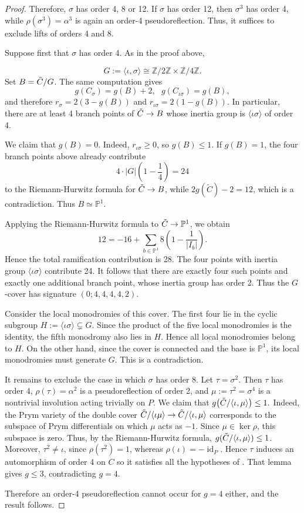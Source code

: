 \documentclass[10pt,a4paper]{amsart}
\numberwithin{equation}{section}
\newcommand{\tC}{\Tilde{C}}
\DeclareMathOperator{\id}{id}
\begin{document}
\begin{proof}
Therefore, $\sigma$ has order 4, 8 or 12. If $\sigma$ has order 12, then $\sigma^3$ has order 4, while
$\rho(\sigma^3)=\alpha^3$ is again an order-4 pseudoreflection. Thus, it suffices to exclude lifts of orders 4 and 8.

Suppose first that $\sigma$ has order 4. As in the proof above,

$$G:=\langle\iota,\sigma\rangle
\cong\mathbb{Z}/2\mathbb{Z}\times\mathbb {Z}/4\mathbb{Z}.$$
Set $B=\tC/G$. The same computation gives
$$g(C_\sigma)=g(B)+2,\ \ \ g(C_{\iota\sigma})=g(B),$$
and therefore
$r_\sigma=2(3-g(B))$ and $ r_{\iota\sigma}=2(1-g(B)).$
In particular, there are at least 4
branch points of $\tC\to B$ whose inertia group is $\langle\iota\sigma\rangle$ of order 4.

We claim that $g(B)=0$. Indeed, $r_{\iota\sigma}\geq0$, so
$g(B)\leq 1$. If $g(B)=1$, the four branch points above already
contribute $$4\cdot |G|\left(1-\frac14\right)=24$$
to the Riemann-Hurwitz formula for $\tC\to B$, while $2g(\widetilde C)-2=12$, which is a contradiction. Thus $B\simeq\mathbb{P}^1$.

Applying the Riemann-Hurwitz formula to 
$\tC\to\mathbb P^1$, we obtain $$12=-16+\sum_{b\in\mathbb P^1}
8\left(1-\frac1{|I_b|}\right).$$
Hence the total ramification contribution is 28. The four points
with inertia group $\langle\iota\sigma\rangle$ contribute 24. It follows that there are exactly four such points and exactly
one additional branch point, whose inertia group has order 2.
Thus the $G$-cover has signature $(0;4,4,4,4,2).$ 

Consider the local monodromies of this cover. The first four lie in
the cyclic subgroup $H:=\langle\iota\sigma\rangle\subsetneq G.$
Since the product of the five local monodromies is the identity, the
fifth monodromy also lies in $H$. Hence all local monodromies belong
to $H$. On the other hand, since the cover is connected and the base
is $\mathbb P^1$, its local monodromies must generate $G$. This is
a contradiction.

It remains to exclude the case in which $\sigma$ has order 8. Let $\tau=\sigma^2$. Then $\tau$ has order $4$, $\rho(\tau)=\alpha^2$ is a
pseudoreflection of order 2, and $\mu:=\tau^2=\sigma^4$ is a nontrivial involution acting trivially on $P$. We claim that $g\bigl(\tC/\langle\iota,\mu\rangle\bigr)\leq1.$ Indeed, the Prym variety of the double cover $\tC/\langle\iota\mu\rangle \to \tC/\langle\iota,\mu\rangle$
corresponds to the subspace of Prym differentials on which $\mu$
acts as $-1$. Since $\mu\in\ker\rho$, this subspace is zero. Thus, by the Riemann-Hurwitz formula, $g(\tC/\langle\iota,\mu\rangle) \leq 1$. Moreover, $\tau^2\neq\iota$, since
$\rho(\tau^2)=1$, whereas $\rho(\iota)=-\id_P$. Hence $\tau$ induces an automorphism of order 4 on $C$ so it satisfies all the hypotheses of \cite[Lemma 3.5]{ALN}. That lemma gives $g\leq3$, contradicting $g=4$.

Therefore an order-4 pseudoreflection cannot occur for $g=4$ either, and the result follows.
\end{proof}
\end{document}
